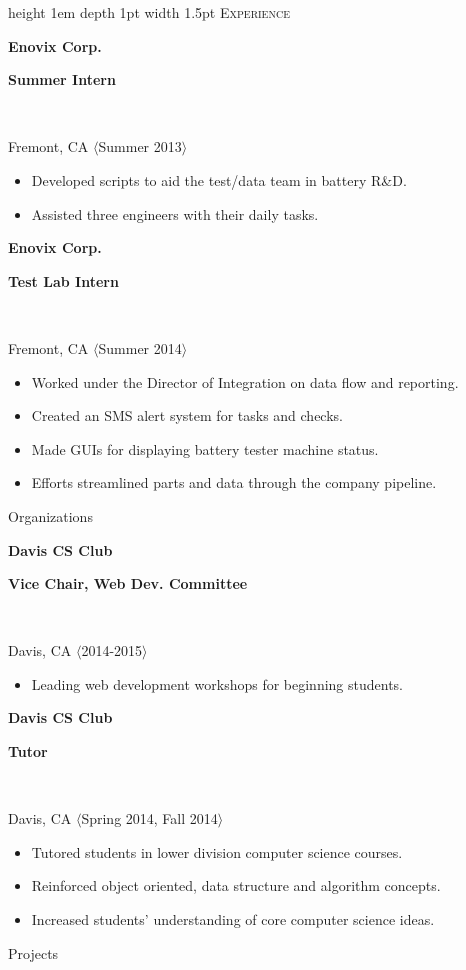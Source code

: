 \documentclass[letterpaper]{article}
\newcommand{\sectiontitle}[1]{
	{\color{magenta} \vline height 1em depth 1pt width 1.5pt}%
	{\large \colorbox{offwhite}{\color{black} \textsc{#1}}}
	\vspace*{0.5em}
}
\newcommand{\sectionseparator}[1]{
	\hline
	\vspace*{1em}
}
\newcommand{\experiencepanel}[4]{
	\textbf{{#1}}
	\begin{footnotesize}
		\textbf{{#2}}
	\end{footnotesize}
	\\
	\begin{scriptsize} 
		{#3} $\langle${#4}$\rangle$
	\end{scriptsize}
}
\newenvironment{statementlist}{
		\begin{small}
		\begin{itemize}
		\setlength\itemsep{0em}
}{
		\end{itemize}
		\end{small}
		\vspace*{1em}
}
\begin{document}
	\begin{minipage}[t]{0.55\textwidth}
	
		\sectiontitle{Experience}
		
		\experiencepanel{Enovix Corp.}{Summer Intern}{Fremont, CA}{Summer 2013}
		\begin{statementlist}
			\item Developed scripts to aid the test/data team in battery R\&D.
			\item Assisted three engineers with their daily tasks.
		\end{statementlist}
		
		\experiencepanel{Enovix Corp.}{Test Lab Intern}{Fremont, CA}{Summer 2014}
		\begin{statementlist}
			\item Worked under the Director of Integration on data flow and reporting.
			\item Created an SMS alert system for tasks and checks.
			\item Made GUIs for displaying battery tester machine status.
			\item Efforts streamlined parts and data through the company pipeline.
		\end{statementlist}
		
		\sectionseparator
			
		\sectiontitle{Organizations}
		
		\experiencepanel{Davis CS Club}{Vice Chair, Web Dev. Committee}{Davis, CA}{2014-2015}
		\begin{statementlist}
			\item Leading web development workshops for beginning students. 
		\end{statementlist}	
		
		\experiencepanel{Davis CS Club}{Tutor}{Davis, CA}{Spring 2014, Fall 2014}
		\begin{statementlist}
			\item Tutored students in lower division computer science courses.
			\item Reinforced object oriented, data structure and algorithm concepts.
			\item Increased students' understanding of core computer science ideas.
		\end{statementlist}	
		
		\sectionseparator
	
		\sectiontitle{Projects}	
		

\end{minipage}
\end{document}
